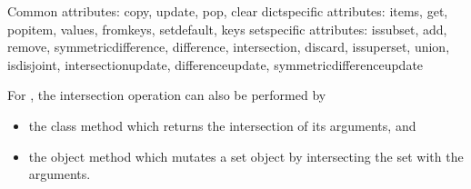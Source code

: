 \documentclass[letterpaper,10pt,english]{sphinxmanual}
\begin{document}
\begin{sphinxVerbatim}[commandchars=\\\{\}]
        \PYG{p}{[}\PYG{p}{]}  
        \PYG{p}{[}\PYG{p}{]}  
  
  
  
\end{sphinxVerbatim}

\begin{sphinxVerbatim}[commandchars=\\\{\}]
Common attributes: copy, update, pop, clear
dict\PYGZhy{}specific attributes: items, get, popitem, values, fromkeys, setdefault, keys
set\PYGZhy{}specific attributes: issubset, add, remove, symmetric\PYGZus{}difference, difference, intersection, discard, issuperset, union, isdisjoint, intersection\PYGZus{}update, difference\PYGZus{}update, symmetric\PYGZus{}difference\PYGZus{}update
\end{sphinxVerbatim}

For , the intersection operation \sphinxcode{\sphinxupquote{\&}} can also be performed by
\begin{itemize}
\item {} 
the class method  which returns the intersection of its arguments, and

\item {} 
the object method  which mutates a set object by intersecting the set with the arguments.

\end{itemize}
\end{document}

